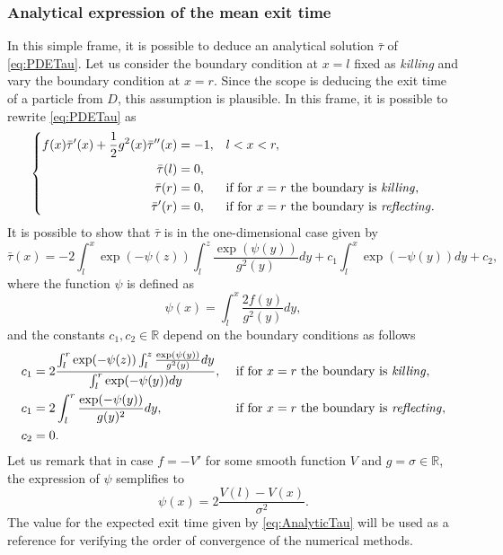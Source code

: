 \subsubsection{Analytical expression of the mean exit time}
In this simple frame, it is possible to deduce an analytical solution $\bar\tau$ of \eqref{eq:PDETau}. Let us consider the boundary condition at $x=l$ fixed as \textit{killing} and vary the boundary condition at $x=r$. Since the scope is deducing the exit time of a particle from $D$, this assumption is plausible. In this frame, it is possible to rewrite \eqref{eq:PDETau} as
\begin{equation}\label{eq:ODETau}
\left \{
\begin{aligned}
	f(x)\bar\tau'(x) + \frac{1}{2} g^2(x) \bar\tau''(x) &= -1, && l < x < r, \\
	\bar\tau(l) &= 0, \\
	\bar\tau(r) &= 0, && \text{if for $x = r$ the boundary is \textit{killing}}, \\
	\bar\tau'(r) &= 0, && \text{if for $x = r$ the boundary is \textit{reflecting}}. 
\end{aligned} \right .
\end{equation}
It is possible to show \cite{Krumscheid2015,Pavliotis2014} that $\bar\tau$ is in the one-dimensional case given by
\begin{equation}\label{eq:AnalyticTau}
	\bar\tau(x) = -2 \int_l^x \exp(-\psi(z)) \int_l^z \frac{\exp(\psi(y))}{g^2(y)}dy + c_1 \int_l^x \exp(-\psi(y))dy + c_2,
\end{equation}
where the function $\psi$ is defined as
\begin{equation}\label{eq:psi}
	\psi(x) = \int_l^x \frac{2f(y)}{g^2(y)}dy,
\end{equation}
and the constants $c_1,c_2 \in \mathbb{R}$ depend on the boundary conditions as follows
\begin{equation}\label{eq:Constants}
\begin{aligned}
	c_1 &= 2\frac{\int_l^r \exp(-\psi(z)) \int_l^z \frac{\exp(\psi(y))}{g^2(y)}dy}{\int_l^r \exp(-\psi(y))dy}, && \text{  if for $x = r$ the boundary is \textit{killing}}, \\
	c_1 &= 2\int_l^r \frac{\exp(-\psi(y))}{g(y)^2}dy, && \text{  if for $x = r$ the boundary is \textit{reflecting}}, \\
	c_2 &= 0.
\end{aligned}
\end{equation}
Let us remark that in case $f = -V'$ for some smooth function $V$ and $g = \sigma \in \mathbb{R}$, the expression of $\psi$ semplifies to
\begin{equation}\label{eq:psiSemplified}
	\psi(x) = 2\frac{V(l)-V(x)}{\sigma^2}.
\end{equation}
The value for the expected exit time given by \eqref{eq:AnalyticTau} will be used as a reference for verifying the order of convergence of the numerical methods.

